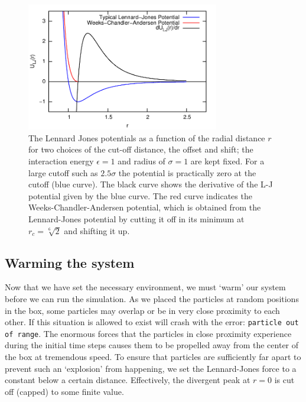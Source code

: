 \documentclass[
paper=a4,                       %
fontsize=11pt,                  %
twoside,                        %
footsepline,                    %
headsepline,                    %
headinclude=false,              %
footinclude=false,              %
pagesize,                       %
]{scrartcl}
\begin{document}
\begin{figure}[ht]
\begin{center}
\includegraphics[width=0.75\textwidth]{figures/lennard-jones-potential.pdf}
\caption{\label{fig:lennard-jones} The Lennard Jones potentials as a function of the radial distance $r$ for two choices of the cut-off distance, the offset and shift; the interaction energy $\epsilon=1$ and radius of $\sigma=1$ are kept fixed. For a large cutoff such as $2.5\sigma$ the potential is practically zero at the cutoff (blue curve). The black curve shows the derivative of the L-J potential given by the blue curve. The red curve indicates the Weeks-Chandler-Andersen potential, which is obtained from the Lennard-Jones potential by cutting it off in its minimum at $r_c=\sqrt[6]{2}$ and shifting it up.}
\end{center}
\end{figure}

\subsection{Warming the system}
 
Now that we have set the necessary environment, we must `warm' our system before we can run the simulation. As we placed the particles at random positions in the box, some particles may overlap or be in very close proximity to each other. If this situation is allowed to exist \es{} will crash with the error: \texttt{particle out of range}. The enormous forces that the particles in close proximity experience during the initial time steps causes them to be propelled away from the center of the box at tremendous speed. To ensure that particles are sufficiently far apart to prevent such an `explosion' from happening, we set the Lennard-Jones force to a constant below a certain distance. Effectively, the divergent peak at $r = 0$ is cut off (capped) to some finite value.
\end{document}
